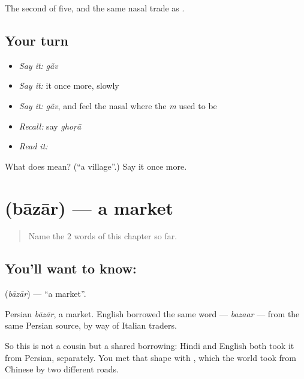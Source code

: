 \begin{grammarlens}[title={What you've built}]
The second of five, and the same nasal trade as .
\end{grammarlens}

\subsection*{Your turn}
\begin{itemize}
\raggedright
  \item \emph{Say it:} \emph{gā̃v}
  \item \emph{Say it:} it once more, slowly
  \item \emph{Say it:} \emph{gā̃v}, and feel the nasal where the \emph{m} used to be
  \item \emph{Recall:} say \emph{ghoṛā}
  \item \emph{Read it:} \textbf{}
\end{itemize}

\begin{tcolorbox}[breakable,colback=teal!4,colframe=teal!35!black,title={Before you move on}]
What does  mean? (\textquotedblleft{}a village\textquotedblright{}.) Say it once more.
\end{tcolorbox}
\section[\texorpdfstring{\hi{बाज़ार} (bāzār)}{बाज़ार (bāzār)}]{ (bāzār) — a market}

\label{lesson:HI-C56-market}



\begin{quote}
Name the 2 words of this chapter so far.
\end{quote}

\subsection*{You'll want to know: }
\textbf{} (\emph{bāzār}) — \textquotedblleft{}a market\textquotedblright{}.

Persian \emph{bāzār}, a market. English borrowed the same word — \emph{bazaar} — from the same Persian source, by way of Italian traders.

So this is not a cousin but a shared borrowing: Hindi and English both took it from Persian, separately. You met that shape with , which the world took from Chinese by two different roads.

